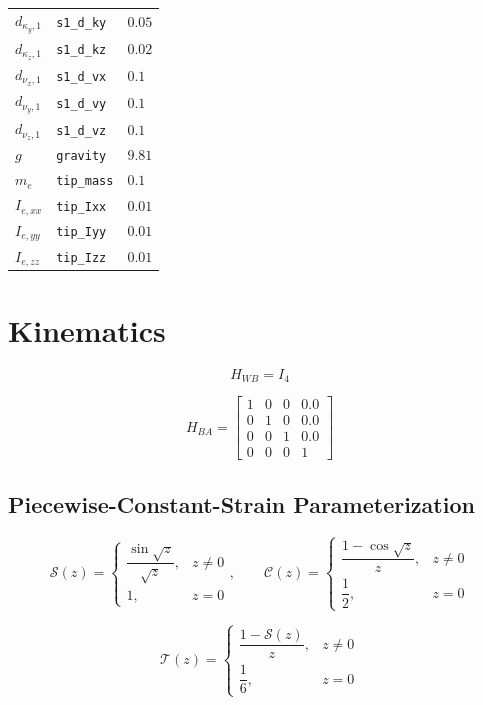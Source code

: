 \documentclass[11pt]{article}
\newcommand{\Sfun}{\mathcal{S}}
\newcommand{\Cfun}{\mathcal{C}}
\newcommand{\Tfun}{\mathcal{T}}
\begin{document}
\begin{longtable}{lll}
$d_{\kappa_y,1}$ & \texttt{s1\_d\_ky} & $0.05$ \\
$d_{\kappa_z,1}$ & \texttt{s1\_d\_kz} & $0.02$ \\
$d_{\nu_x,1}$ & \texttt{s1\_d\_vx} & $0.1$ \\
$d_{\nu_y,1}$ & \texttt{s1\_d\_vy} & $0.1$ \\
$d_{\nu_z,1}$ & \texttt{s1\_d\_vz} & $0.1$ \\
$g$ & \texttt{gravity} & $9.81$ \\
$m_e$ & \texttt{tip\_mass} & $0.1$ \\
$I_{e,xx}$ & \texttt{tip\_Ixx} & $0.01$ \\
$I_{e,yy}$ & \texttt{tip\_Iyy} & $0.01$ \\
$I_{e,zz}$ & \texttt{tip\_Izz} & $0.01$ \\
\hline
\end{longtable}

\section{Kinematics}
\begin{equation}
H_{WB}=I_4
\end{equation}

\begin{equation}
H_{BA}=\begin{bmatrix}1 & 0 & 0 & 0.0\\0 & 1 & 0 & 0.0\\0 & 0 & 1 & 0.0\\0 & 0 & 0 & 1\end{bmatrix}\label{eq:mount-transform}
\end{equation}

\subsection{Piecewise-Constant-Strain Parameterization}
\begin{equation}
\Sfun(z)=\begin{cases}\dfrac{\sin\sqrt z}{\sqrt z},&z\ne0\\1,&z=0\end{cases},\qquad \Cfun(z)=\begin{cases}\dfrac{1-\cos\sqrt z}{z},&z\ne0\\\dfrac12,&z=0\end{cases}
\end{equation}

\begin{equation}
\Tfun(z)=\begin{cases}\dfrac{1-\Sfun(z)}{z},&z\ne0\\\dfrac16,&z=0\end{cases}
\end{equation}
\end{document}

